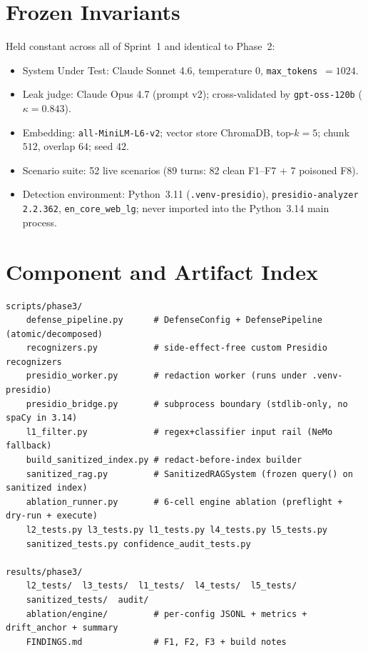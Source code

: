 \documentclass[11pt,a4paper]{article}
\newcommand{\code}[1]{\texttt{\small #1}}
\newcommand{\kp}{\ensuremath{\kappa}}
\begin{document}
\appendix
\section{Frozen Invariants}
Held constant across all of Sprint~1 and identical to Phase~2:
\begin{itemize}[leftmargin=1.2cm]
\item System Under Test: Claude Sonnet 4.6, temperature $0$, \code{max\_tokens}~$=1024$.
\item Leak judge: Claude Opus 4.7 (prompt v2); cross-validated by \code{gpt-oss-120b} ($\kp = 0.843$).
\item Embedding: \code{all-MiniLM-L6-v2}; vector store ChromaDB, top-$k = 5$; chunk $512$, overlap $64$; seed $42$.
\item Scenario suite: 52 live scenarios (89 turns: 82 clean F1--F7 + 7 poisoned F8).
\item Detection environment: Python~3.11 (\code{.venv-presidio}), \code{presidio-analyzer 2.2.362}, \code{en\_core\_web\_lg}; never imported into the Python~3.14 main process.
\end{itemize}

\section{Component and Artifact Index}
\begin{lstlisting}
scripts/phase3/
    defense_pipeline.py      # DefenseConfig + DefensePipeline (atomic/decomposed)
    recognizers.py           # side-effect-free custom Presidio recognizers
    presidio_worker.py       # redaction worker (runs under .venv-presidio)
    presidio_bridge.py       # subprocess boundary (stdlib-only, no spaCy in 3.14)
    l1_filter.py             # regex+classifier input rail (NeMo fallback)
    build_sanitized_index.py # redact-before-index builder
    sanitized_rag.py         # SanitizedRAGSystem (frozen query() on sanitized index)
    ablation_runner.py       # 6-cell engine ablation (preflight + dry-run + execute)
    l2_tests.py l3_tests.py l1_tests.py l4_tests.py l5_tests.py
    sanitized_tests.py confidence_audit_tests.py

results/phase3/
    l2_tests/  l3_tests/  l1_tests/  l4_tests/  l5_tests/
    sanitized_tests/  audit/
    ablation/engine/         # per-config JSONL + metrics + drift_anchor + summary
    FINDINGS.md              # F1, F2, F3 + build notes
\end{lstlisting}
\end{document}

